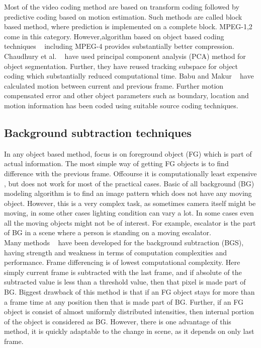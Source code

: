 \indent Most of the video coding method are based on transform coding
followed by predictive coding based on motion estimation. Such methods
are called block based method, where prediction is implemented on a
complete block.  MPEG-1,2 come in this category. However,algorithm based
on object based coding techniques ~\cite{7, 8} including MPEG-4 provides
substantially better compression. Chaudhury et al. ~\cite{7} have used
principal component analysis (PCA) method for object
segmentation. Further, they have reused tracking subspace for object
coding which substantially reduced computational time. Babu and Makur
~\cite{8} have calculated motion between current and previous frame.
Further motion compensated error and other object parameters such as
boundary, location and motion information has been coded using suitable
source coding techniques. \\

\subsection{Background subtraction techniques}
\indent In any object based method, focus is on foreground object (FG)
which is part of actual information. The most simple way of getting FG
objects is to find difference with the previous frame. Offcourse it is
computationally least expensive , but does not work for most of the
practical cases. Basic of all background (BG) modeling algorithm is to
find an image pattern which does not have any moving object. However,
this is a very complex task, as sometimes camera itself might be moving,
in some other cases lighting condition can vary a lot. In some cases
even all the moving objects might not be of interest. For example,
escalator is the part of BG in a scene where a person is standing on a
moving escalator.\\

\indent Many methods ~\cite{9, 10, 11, 12, 13, 14} have been developed
for the background subtraction (BGS), having strength and weakness in
terms of computation complexities and performance. Frame differencing is
of lowest computational complexity. Here simply current frame is
subtracted with the last frame, and if absolute of the subtracted value
is less than a threshold value, then that pixel is made part of BG.
Biggest drawback of this method is that if an FG object stays for more
than a frame time at any position then that is made part of BG. Further,
if an FG object is consist of almost uniformly distributed intensities,
then internal portion of the object is considered as BG. However, there
is one advantage of this method, it is quickly adaptable to the change
in scene, as it depends on only last frame.\\

